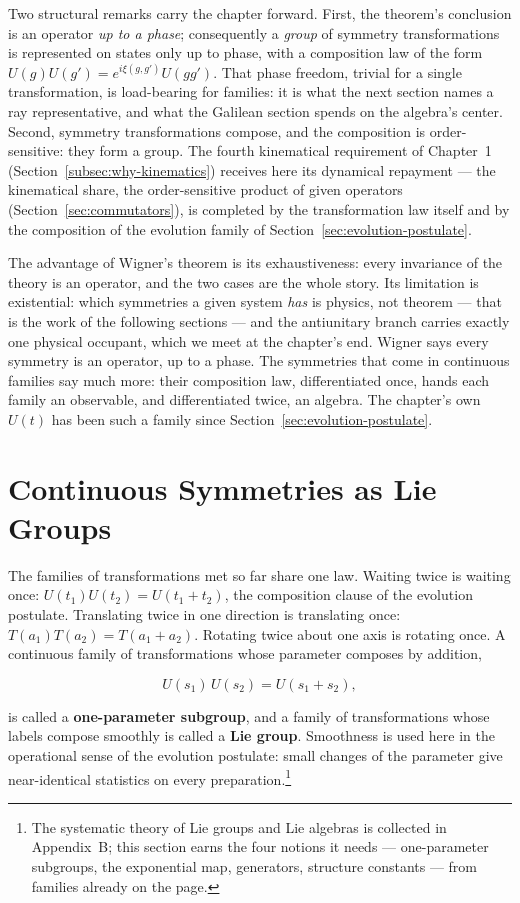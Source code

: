 Two structural remarks carry the chapter forward. First, the theorem's conclusion is an operator \emph{up to a phase}; consequently a \emph{group} of symmetry transformations is represented on states only up to phase, with a composition law of the form $U(g)U(g')=e^{i\xi(g,g')}U(gg')$. That phase freedom, trivial for a single transformation, is load-bearing for families: it is what the next section names a ray representative, and what the Galilean section spends on the algebra's center. Second, symmetry transformations compose, and the composition is order-sensitive: they form a group. The fourth kinematical requirement of Chapter~1 (Section~\ref{subsec:why-kinematics}) receives here its dynamical repayment --- the kinematical share, the order-sensitive product of given operators (Section~\ref{sec:commutators}), is completed by the transformation law itself and by the composition of the evolution family of Section~\ref{sec:evolution-postulate}.

The advantage of Wigner's theorem is its exhaustiveness: every invariance of the theory is an operator, and the two cases are the whole story. Its limitation is existential: which symmetries a given system \emph{has} is physics, not theorem --- that is the work of the following sections --- and the antiunitary branch carries exactly one physical occupant, which we meet at the chapter's end. Wigner says every symmetry is an operator, up to a phase. The symmetries that come in continuous families say much more: their composition law, differentiated once, hands each family an observable, and differentiated twice, an algebra. The chapter's own $U(t)$ has been such a family since Section~\ref{sec:evolution-postulate}.

\section{Continuous Symmetries as Lie Groups}
\label{sec:lie-groups}

The families of transformations met so far share one law. Waiting twice is waiting once: $U(t_1)U(t_2)=U(t_1+t_2)$, the composition clause of the evolution postulate. Translating twice in one direction is translating once: $T(a_1)T(a_2)=T(a_1+a_2)$. Rotating twice about one axis is rotating once. A continuous family of transformations whose parameter composes by addition,
\begin{linenomath}
    \begin{equation}
        U(s_1)\,U(s_2) = U(s_1+s_2),
        \label{eq:one-parameter-subgroup}
    \end{equation}
\end{linenomath}
is called a \textbf{one-parameter subgroup}, and a family of transformations whose labels compose smoothly is called a \textbf{Lie group}. Smoothness is used here in the operational sense of the evolution postulate: small changes of the parameter give near-identical statistics on every preparation.\footnote{The systematic theory of Lie groups and Lie algebras is collected in Appendix~B; this section earns the four notions it needs --- one-parameter subgroups, the exponential map, generators, structure constants --- from families already on the page.}

